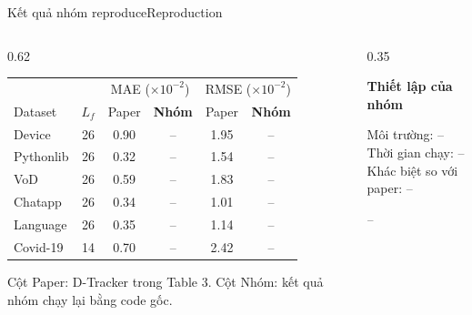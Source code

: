 \begin{frame}{Kết quả nhóm reproduce}{Reproduction}
\begin{columns}[T,onlytextwidth]
\begin{column}{0.62\textwidth}
\centering\small
\begin{tabular}{@{}lc|cc|cc@{}}
  \toprule
  & & \multicolumn{2}{c|}{MAE ($\times10^{-2}$)} & \multicolumn{2}{c}{RMSE ($\times10^{-2}$)}\\
  Dataset & $L_f$ & Paper & \textbf{Nhóm} & Paper & \textbf{Nhóm}\\
  \midrule
  Device    & 26 & 0.90 & -- & 1.95 & -- \\
  Pythonlib & 26 & 0.32 & -- & 1.54 & -- \\
  VoD       & 26 & 0.59 & -- & 1.83 & -- \\
  Chatapp   & 26 & 0.34 & -- & 1.01 & -- \\
  Language  & 26 & 0.35 & -- & 1.14 & -- \\
  Covid-19  & 14 & 0.70 & -- & 2.42 & -- \\
  \bottomrule
\end{tabular}\par
\vspace{1mm}
{\scriptsize\color{DTMuted}Cột Paper: D-Tracker trong Table 3. Cột Nhóm: kết quả nhóm chạy lại bằng code gốc.\par}
\end{column}
\begin{column}{0.35\textwidth}
\begin{questioncard}
  \small\textbf{Thiết lập của nhóm}\par\vspace{1mm}
  Môi trường: --\\
  Thời gian chạy: --\\
  Khác biệt so với paper: --
\end{questioncard}
\vspace{2mm}
\begin{takeaway}
  \small --
\end{takeaway}
\end{column}
\end{columns}
\vfill
{}
\end{frame}

